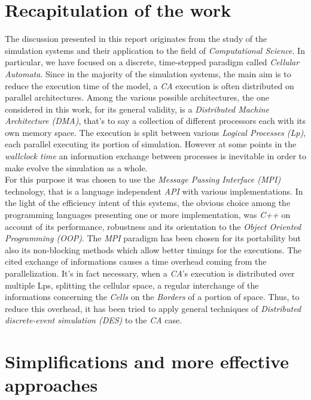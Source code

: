 \documentclass[12pt,a4paper,fleqn]{report}
\begin{document}
\section{Recapitulation of the work}
The discussion presented in this report originates from the study of the simulation systems and their application to the field of \textit{Computational Science}. In particular, we have focused on a discrete, time-stepped paradigm called \textit{Cellular Automata}. Since in the majority of the simulation systems, the main aim is to reduce the execution time of the model, a \textit{CA} execution is often distributed on parallel architectures. Among the various possible architectures, the one considered in this work, for its general validity, is a \textit{Distributed Machine Architecture (DMA)}, that's to say a collection of different processors each with its own memory space. The execution is split between various \textit{Logical Processes (Lp)}, each parallel executing its portion of simulation. However at some points in the \textit{wallclock time} an information exchange between processes is inevitable in order to make evolve the simulation as a whole.\\
 For this purpose it was chosen to use the \textit{Message Passing Interface (MPI)} technology, that is a language independent \textit{API} with various implementations. In the light of the efficiency intent of this systems, the obvious choice among the programming languages presenting one or more implementation, was \textit{C++} on account of its performance, robustness and its orientation to the \textit{Object Oriented Programming (OOP)}. The \textit{MPI} paradigm has been chosen for its portability but also its non-blocking methods which allow better timings for the executions. The cited exchange of informations causes a time overhead coming from the parallelization. It's in fact necessary, when a \textit{CA}'s execution is distributed over multiple Lps, splitting the cellular space, a regular interchange of the informations concerning the \textit{Cells} on the \textit{Borders} of a portion of space. Thus, to reduce this overhead, it has been tried to apply general techniques of \textit{Distributed discrete-event simulation (DES)} to the \textit{CA} case. 
 
 \section{Simplifications and more effective approaches}
 
\end{document}
